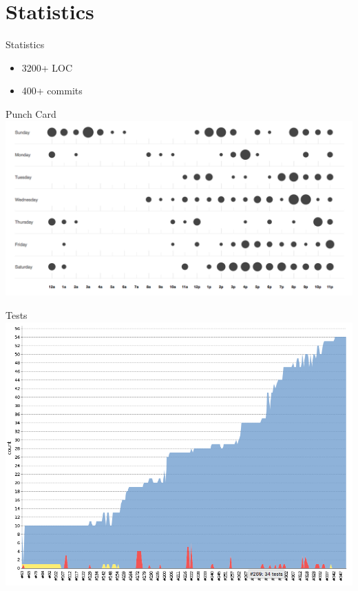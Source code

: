 \section{Statistics}

\begin{frame}{Statistics}
\begin{itemize}
	\item 3200+ LOC
	\item 400+ commits
\end{itemize}
\end{frame}

\begin{frame}{Punch Card}
	\includegraphics[width=\textwidth]{./resources/punchcard.png}
\end{frame}

\begin{frame}{Tests}
	\includegraphics[width=\textwidth]{./resources/tests.png}
\end{frame}
